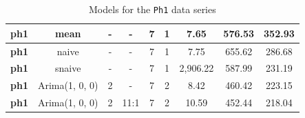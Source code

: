 \documentclass[12pt,a4paper,titlepage]{report}
\begin{document}
\begin{appendices}
\begin{table}[h]
\begin{tabular}{|c|c|c|c|c|c|c|c|c|}
        \textbf{ph1}      & mean                    & - & -    & 7 & 1 & 7.65     & 576.53 & 352.93 \\ \hline
        \textbf{ph1}      & naive                   & - & -    & 7 & 1 & 7.75     & 655.62 & 286.68 \\ \hline
        \textbf{ph1}      & snaive                  & - & -    & 7 & 1 & 2,906.22 & 587.99 & 231.19 \\ \hline
        \textbf{ph1}      & Arima(1, 0, 0)  & 2 & -    & 7 & 2 & 8.42     & 460.42 & 223.15 \\ \hline
        \textbf{ph1}      & Arima(1, 0, 0)  & 2 & 11:1 & 7 & 2 & 10.59    & 452.44 & 218.04 \\ \hline
    \end{tabular}
    
    \centering
    \caption{Models for the \texttt{Ph1} data series}
    \label{ph1results}
\end{table}


\end{appendices}
\end{document}
